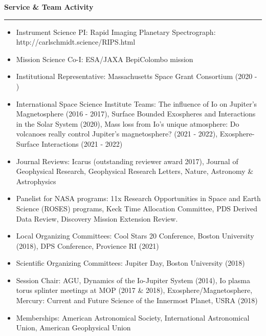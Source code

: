 \documentclass[12pt]{report}
\begin{document}
\noindent\bf{Service \& Team Activity}\rm \hspace*{\fill} \\
\rule{\textwidth}{1pt}
\begin{itemize} \itemsep -2pt %
  \item Instrument Science PI: Rapid Imaging Planetary Spectrograph: http://carlschmidt.science/RIPS.html
  \item Mission Science Co-I: ESA/JAXA BepiColombo mission
  \item Institutional Representative: Massachusetts Space Grant Consortium (2020 - )
  \item International Space Science Institute Teams: The influence of Io on Jupiter's Magnetosphere (2016 - 2017), Surface Bounded Exospheres and Interactions in the Solar System (2020), Mass loss from Io’s unique atmosphere: Do volcanoes really control Jupiter’s magnetosphere? (2021 - 2022), Exosphere-Surface Interactions (2021 - 2022)
  \item Journal Reviews: Icarus (outstanding reviewer award 2017), Journal of Geophysical Research, Geophysical Research Letters, Nature, Astronomy \& Astrophysics
  \item Panelist for NASA programs: 11x Research Opportunities in Space and Earth Science (ROSES) programs, Keck Time Allocation Committee, PDS Derived Data Review, Discovery Mission Extension Review.
  \item Local Organizing Committees: Cool Stars 20 Conference, Boston University (2018), DPS Conference, Provience RI (2021)
  \item Scientific Organizing Committees: Jupiter Day, Boston University (2018)
  \item Session Chair: AGU, Dynamics of the Io-Jupiter System (2014), Io plasma torus splinter meetings at MOP (2017 \& 2018), Exosphere/Magnetosphere, Mercury: Current and Future Science of the Innermost Planet, USRA (2018)
  \item Memberships: American Astronomical Society, 	International Astronomical Union, American Geophysical Union
\end{itemize}
\vspace{2 mm}
\end{document}

